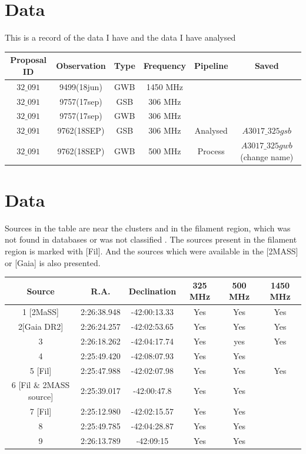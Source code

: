 \documentclass[11pt]{report}
\begin{document}
\section{Data}
This is a record of the data I have and the data I have analysed
\begin{table}
\begin{tabular}{|c|c|c|c|c|c|}
\hline
Proposal ID & Observation & Type & Frequency & Pipeline & Saved\\
\hline
$32\_091$ &  9499(18jun) & GWB & 1450 MHz & &\\
\hline
$32\_091$ &  9757(17sep) & GSB & 306 MHz & &\\
\hline
$32\_091$ &  9757(17sep) & GWB & 306 MHz & &\\
\hline
$32\_091$ &  9762(18SEP) & GSB & 306 MHz & Analysed & $A3017\_325gsb$\\
\hline
$32\_091$ &  9762(18SEP) & GWB & 500 MHz & Process & $A3017\_325gwb$(change name)\\
\hline
\end{tabular}
\end{table}

\section{Data}
Sources in the table are near the clusters and in the filament region, which was not found in databases or was not classified . The sources present in the filament region is marked with [Fil]. And the sources which were available in the [2MASS] or [Gaia] is also presented.
\begin{table}
\begin{tabular}{|c|c|c|c|c|c|}
\hline
Source & R.A. & Declination & 325 MHz & 500 MHz & 1450 MHz\\
\hline
1 [2MaSS]& 2:26:38.948 & -42:00:13.33 & Yes	& Yes	&Yes\\
\hline
2[Gaia DR2] & 2:26:24.257  & -42:02:53.65 &	 Yes& Yes	&Yes\\
\hline
3 & 2:26:18.262 & -42:04:17.74 & Yes	& yes	&Yes\\
\hline
4 & 2:25:49.420 & -42:08:07.93 &	 Yes& Yes	&\\
\hline
5 [Fil] & 2:25:47.988 & -42:02:07.98 &	 Yes& Yes	&Yes\\
\hline
6 [Fil $\&$ 2MASS source]& 2:25:39.017  & -42:00:47.8 &  Yes	& Yes	&\\
\hline
7 [Fil]& 2:25:12.980  & -42:02:15.57 & Yes	& Yes	&\\
\hline
8 & 2:25:49.785 & -42:04:28.87 & Yes	& Yes	&\\
\hline
9 & 2:26:13.789 & -42:09:15 & Yes	& Yes	&\\
\hline
\end{tabular}

\end{table}
\end{document}
